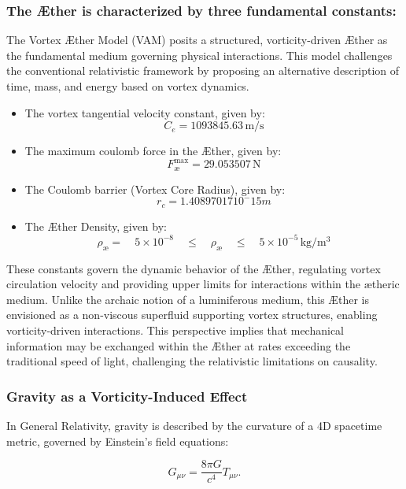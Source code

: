 \subsubsection*{The Æther is characterized by three fundamental constants:}\label{subsec:the-ae-ther-is-characterized-by-three-fundamental-constants:}

The Vortex Æther Model (VAM) posits a structured, vorticity-driven Æther as the fundamental medium governing physical interactions.
This model challenges the conventional relativistic framework by proposing an alternative description of time, mass, and energy based on vortex dynamics.

\begin{itemize}
    \item The vortex tangential velocity constant, given by: \[C_e = 1093845.63 \, \mathrm{m/s}\]
    \item The maximum coulomb force in the Æther, given by:\[F^{\text{max}}_{\text{\ae}} = 29.053507 \, \mathrm{N}\]
    \item The Coulomb barrier (Vortex Core Radius), given by: \[r_c = 1.40897017 10^-15 m\]
    \item The Æther Density, given by: \[\rho_\text{\ae} = \quad 5 \times 10^{-8} \quad \leq \quad \rho_\text{\ae} \quad \leq \quad 5 \times 10^{-5} \, \mathrm{kg/m^3}\]
\end{itemize}

These constants govern the dynamic behavior of the Æther, regulating vortex circulation velocity and providing upper limits for interactions within the ætheric medium.
Unlike the archaic notion of a luminiferous medium, this Æther is envisioned as a non-viscous superfluid supporting vortex structures, enabling vorticity-driven interactions.
This perspective implies that mechanical information may be exchanged within the Æther at rates exceeding the traditional speed of light, challenging the relativistic limitations on causality.


    \subsubsection*{Gravity as a Vorticity-Induced Effect}

    In General Relativity, gravity is described by the curvature of a 4D spacetime metric, governed by Einstein's field equations:

    \begin{equation*}
        G_{\mu\nu} = \frac{8\pi G}{c^4} T_{\mu\nu}.
    \end{equation*}

